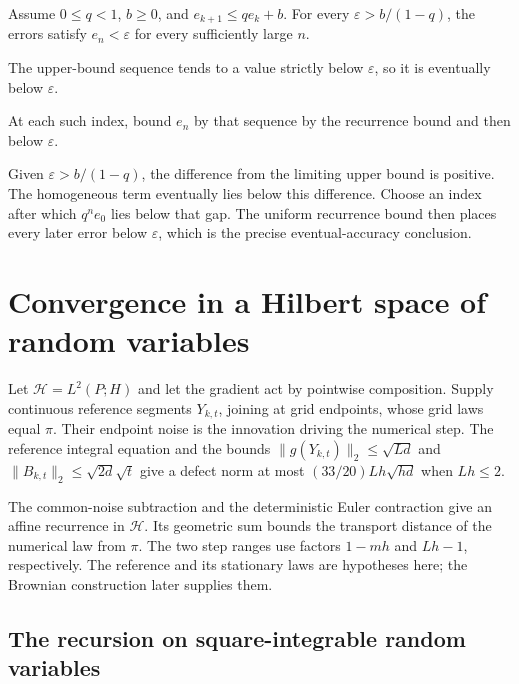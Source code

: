 \documentclass[11pt,a4paper]{article}
\begin{document}
Assume \(0\le q<1\), \(b\ge0\), and \(e_{k+1}\le qe_k+b\). For every \(\varepsilon>b/(1-q)\), the errors satisfy \(e_n<\varepsilon\) for every sufficiently large \(n\).



The upper-bound sequence tends to a value strictly below \(\varepsilon\), so it is eventually below \(\varepsilon\).



At each such index, bound \(e_n\) by that sequence by the recurrence bound and then below \(\varepsilon\).



Given \(\varepsilon>b/(1-q)\), the difference from the limiting upper bound is positive. The homogeneous term eventually lies below this difference. Choose an index after which \(q^ne_0\) lies below that gap. The uniform recurrence bound then places every later error below \(\varepsilon\), which is the precise eventual-accuracy conclusion.


\section{\texorpdfstring{Convergence in a Hilbert space of random variables}{Convergence in a Hilbert space of random variables}}


Let \(\mathcal H=L^2(P;H)\) and let the gradient act by pointwise composition. Supply continuous reference segments \(Y_{k,t}\), joining at grid endpoints, whose grid laws equal \(\pi\). Their endpoint noise is the innovation driving the numerical step. The reference integral equation and the bounds \(\|g(Y_{k,t})\|_2\le\sqrt{Ld}\) and \(\|B_{k,t}\|_2\le\sqrt{2d}\sqrt t\) give a defect norm at most \((33/20)Lh\sqrt{hd}\) when \(Lh\le2\).



The common-noise subtraction and the deterministic Euler contraction give an affine recurrence in \(\mathcal H\). Its geometric sum bounds the transport distance of the numerical law from \(\pi\). The two step ranges use factors \(1-mh\) and \(Lh-1\), respectively. The reference and its stationary laws are hypotheses here; the Brownian construction later supplies them.


\subsection{\texorpdfstring{The recursion on square-integrable random variables}{The recursion on square-integrable random variables}}
\end{document}
